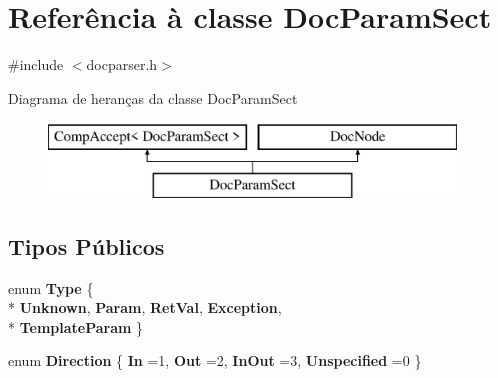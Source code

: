 \hypertarget{class_doc_param_sect}{\section{Referência à classe Doc\-Param\-Sect}
\label{class_doc_param_sect}
}


{\ttfamily \#include $<$docparser.\-h$>$}

Diagrama de heranças da classe Doc\-Param\-Sect\begin{figure}[H]
\begin{center}
\leavevmode
\includegraphics[height=2.000000cm]{class_doc_param_sect}
\end{center}
\end{figure}
\subsection*{Tipos Públicos}
\begin{DoxyCompactItemize}
\item 
enum {\bfseries Type} \{ \\*
{\bfseries Unknown}, 
{\bfseries Param}, 
{\bfseries Ret\-Val}, 
{\bfseries Exception}, 
\\*
{\bfseries Template\-Param}
 \}
\item 
enum {\bfseries Direction} \{ {\bfseries In} =1, 
{\bfseries Out} =2, 
{\bfseries In\-Out} =3, 
{\bfseries Unspecified} =0
 \}
\end{DoxyCompactItemize}
